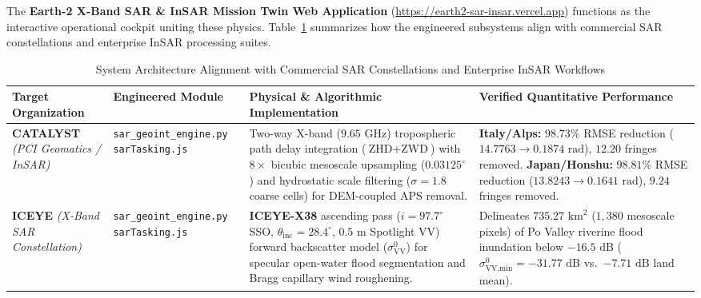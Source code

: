 \documentclass[10pt,twocolumn,letterpaper]{article}
\begin{document}
The \textbf{Earth-2 X-Band SAR \& InSAR Mission Twin Web Application} (\url{https://earth2-sar-insar.vercel.app}) functions as the interactive operational cockpit uniting these physics. Table~\ref{tab:industry_alignment} summarizes how the engineered subsystems align with commercial SAR constellations and enterprise InSAR processing suites.

\begin{table}[t]
\centering
\footnotesize
\setlength{\tabcolsep}{4.5pt}
\caption{System Architecture Alignment with Commercial SAR Constellations and Enterprise InSAR Workflows}
\label{tab:industry_alignment}
\vspace{0.1cm}
\begin{tabularx}{\textwidth}{>{\raggedright\arraybackslash}p{2.8cm} >{\raggedright\arraybackslash}p{3.5cm} >{\raggedright\arraybackslash}p{5.1cm} >{\raggedright\arraybackslash}X}
\toprule
\textbf{Target Organization} & \textbf{Engineered Module} & \textbf{Physical \& Algorithmic Implementation} & \textbf{Verified Quantitative Performance} \\
\midrule
\textbf{CATALYST} \newline \textit{(PCI Geomatics / InSAR)} & \texttt{sar\_geoint\_engine.py} \newline \texttt{sarTasking.js} & Two-way X-band ($9.65\text{ GHz}$) tropospheric path delay integration ($\text{ZHD} + \text{ZWD}$) with $8\times$ bicubic mesoscale upsampling ($0.03125^\circ$) and hydrostatic scale filtering ($\sigma = 1.8$ coarse cells) for DEM-coupled APS removal. & \textbf{Italy/Alps:} $98.73\%$ RMSE reduction ($14.7763 \to 0.1874\text{ rad}$), $12.20$ fringes removed. \newline \textbf{Japan/Honshu:} $98.81\%$ RMSE reduction ($13.8243 \to 0.1641\text{ rad}$), $9.24$ fringes removed. \\
\addlinespace[0.12cm]
\textbf{ICEYE} \newline \textit{(X-Band SAR Constellation)} & \texttt{sar\_geoint\_engine.py} \newline \texttt{sarTasking.js} & \textbf{ICEYE-X38} ascending pass ($i = 97.7^\circ$ SSO, $\theta_{\text{inc}} = 28.4^\circ$, $0.5\text{ m}$ Spotlight VV) forward backscatter model ($\sigma^0_{\text{VV}}$) for specular open-water flood segmentation and Bragg capillary wind roughening. & Delineates \textbf{$735.27\text{ km}^2$} ($1,380$ mesoscale pixels) of Po Valley riverine flood inundation below $-16.5\text{ dB}$ ($\sigma^0_{\text{VV,min}} = -31.77\text{ dB}$ vs.\ $-7.71\text{ dB}$ land mean). \\

\end{tabularx}
\end{table}
\end{document}
